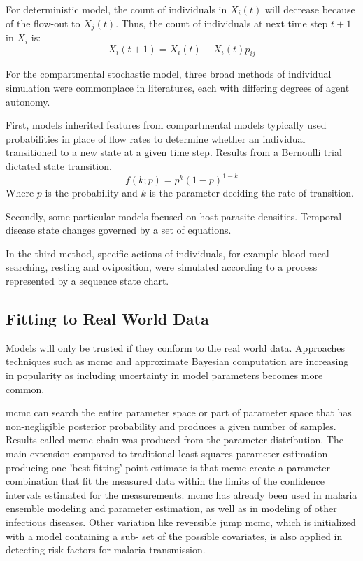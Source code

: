 \documentclass[a4paper, 12pt, twoside]{article}
\begin{document}
For deterministic model, the count of individuals in $X_i(t)$ will decrease because of the flow-out to $X_j(t)$.
Thus, the count of individuals at next time step $t+1$ in $X_i$ is:
\begin{equation}
	X_i(t+1) = X_i(t) - X_i(t)p_{ij}
\end{equation}

For the compartmental stochastic model, three broad methods of individual simulation were commonplace in literatures, each with differing degrees of agent autonomy.

First, models inherited features from compartmental models typically used probabilities in place of flow rates to determine whether an individual transitioned to a new state at a given time step.
Results from a Bernoulli trial dictated state transition.
\begin{equation}
	f(k;p) = p^k ( 1 - p )^{1 - k}
\end{equation}
Where $p$ is the probability and  $k$ is the parameter deciding the rate of transition.

Secondly, some particular models focused on host parasite densities.
Temporal disease state changes governed by a set of equations.

In the third method, specific actions of individuals, for example blood meal searching, resting and oviposition, were simulated according to a process represented by a sequence state chart.

\subsection{Fitting to Real World Data}
Models will only be trusted if they conform to the real world data.
Approaches techniques such as \gls{mcmc} \cite{Hastings1970} and approximate Bayesian computation are increasing in popularity as including uncertainty in model parameters becomes more common.

\gls{mcmc} can search the entire parameter space or part of parameter space that has non-negligible posterior probability and produces a given number of samples.
Results called \gls{mcmc} chain was produced from the parameter distribution.
The main extension compared to traditional least squares parameter estimation producing one ’best fitting’ point estimate is that \gls{mcmc} create a parameter combination that fit the measured data within the limits of the confidence intervals estimated for the measurements.
\gls{mcmc} has already been used in malaria ensemble modeling\cite{Cameron2015,Penny2015,Penny2015a} and parameter estimation, as well as in modeling of other infectious diseases.
Other variation like reversible jump \gls{mcmc}, which is initialized with a model containing a sub- set of the possible covariates, is also applied in detecting risk factors for malaria transmission\cite{Millar2018a}.
\end{document}
